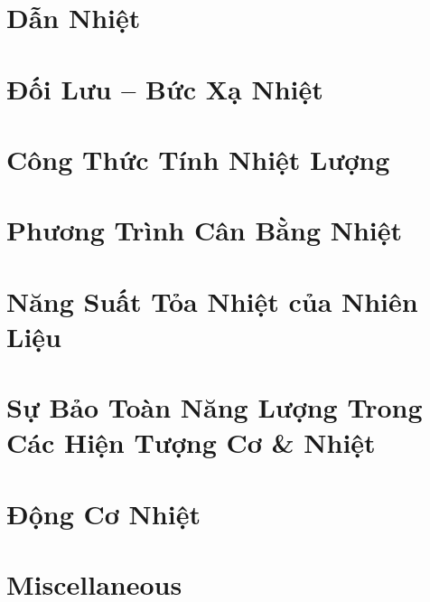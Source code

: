 \documentclass{article}
\numberwithin{equation}{section}
\begin{document}

\section{Dẫn Nhiệt}


\section{Đối Lưu -- Bức Xạ Nhiệt}


\section{Công Thức Tính Nhiệt Lượng}


\section{Phương Trình Cân Bằng Nhiệt}


\section{Năng Suất Tỏa Nhiệt của Nhiên Liệu}


\section{Sự Bảo Toàn Năng Lượng Trong Các Hiện Tượng Cơ \& Nhiệt}


\section{Động Cơ Nhiệt}


\section{Miscellaneous}


\printbibliography[heading=bibintoc]
	
\end{document}
